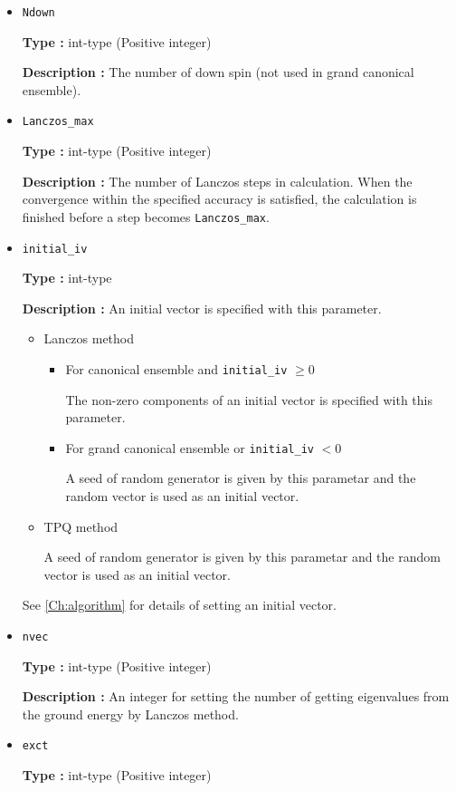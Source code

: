\begin{itemize}
 \item  \verb|Ndown|

{\bf Type :} int-type (Positive integer)

{\bf Description :} The number of down spin (not used in grand canonical ensemble). 


 \item  \verb|Lanczos_max|

{\bf Type :} int-type (Positive integer)

{\bf Description :}  The number of Lanczos steps in calculation. When the convergence within the specified accuracy is satisfied, the calculation is finished before a step becomes  \verb|Lanczos_max|.

 \item  \verb|initial_iv|

{\bf Type :} int-type

{\bf Description :} 
{An initial vector is specified with this parameter.}
\begin{itemize}
\item{Lanczos method}
\begin{itemize}
\item{For canonical ensemble and \verb|initial_iv| $\geq 0$}

The non-zero components of an initial vector is specified with this parameter. 

\item{For grand canonical ensemble or \verb|initial_iv| $< 0$}

A seed of random generator is given by this parametar and the random vector is used as an initial vector.
\end{itemize}

\item{TPQ method}

A seed of random generator is given by this parametar and the random vector is used as an initial vector.
\end{itemize}
See \ref{Ch:algorithm} for details of setting an initial vector.

 \item  \verb|nvec|

{\bf Type :} int-type (Positive integer)

{\bf Description :} An integer for setting the number of getting eigenvalues from the ground energy by Lanczos method.

 \item  \verb|exct|

{\bf Type :} int-type (Positive integer)


\end{itemize}
